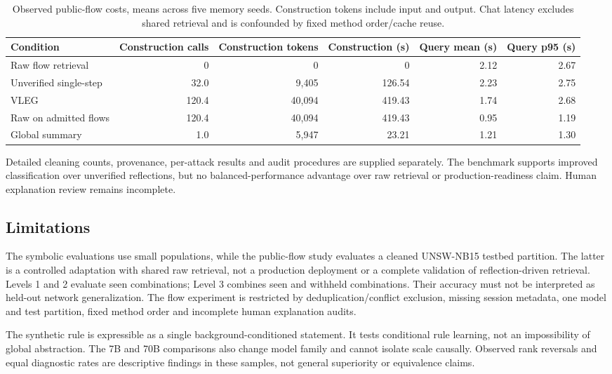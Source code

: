 \documentclass[onecolumn]{IEEEtran}
\numberwithin{equation}{section}
\theoremstyle{definition}
\theoremstyle{remark}
\begin{document}
\begin{table}[!t]
\centering
\caption{Observed public-flow costs, means across five memory seeds. Construction tokens include input and output. Chat latency excludes shared retrieval and is confounded by fixed method order/cache reuse.}
\label{tab:exp6_cost}
\small
\begin{tabular}{lrrrrr}
\toprule
Condition & Construction calls & Construction tokens & Construction (s) & Query mean (s) & Query p95 (s) \\
\midrule
Raw flow retrieval & 0 & 0 & 0 & 2.12 & 2.67 \\
Unverified single-step & 32.0 & 9,405 & 126.54 & 2.23 & 2.75 \\
VLEG & 120.4 & 40,094 & 419.43 & 1.74 & 2.68 \\
Raw on admitted flows & 120.4 & 40,094 & 419.43 & 0.95 & 1.19 \\
Global summary & 1.0 & 5,947 & 23.21 & 1.21 & 1.30 \\
\bottomrule
\end{tabular}
\end{table}

Detailed cleaning counts, provenance, per-attack results and audit procedures are supplied separately. The benchmark supports improved classification over unverified reflections, but no balanced-performance advantage over raw retrieval or production-readiness claim. Human explanation review remains incomplete.

\subsection{Limitations}
\label{sec:limitations}
The symbolic evaluations use small populations, while the public-flow study evaluates a cleaned UNSW-NB15 testbed partition. The latter is a controlled adaptation with shared raw retrieval, not a production deployment or a complete validation of reflection-driven retrieval. Levels 1 and 2 evaluate seen combinations; Level 3 combines seen and withheld combinations. Their accuracy must not be interpreted as held-out network generalization. The flow experiment is restricted by deduplication/conflict exclusion, missing session metadata, one model and test partition, fixed method order and incomplete human explanation audits.

The synthetic rule is expressible as a single background-conditioned statement. It tests conditional rule learning, not an impossibility of global abstraction. The 7B and 70B comparisons also change model family and cannot isolate scale causally. Observed rank reversals and equal diagnostic rates are descriptive findings in these samples, not general superiority or equivalence claims.
\end{document}
